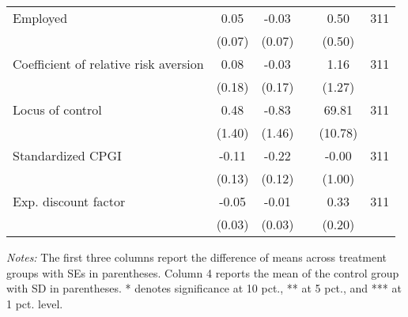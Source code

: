\begin{table}[h]
{\begin{threeparttable}
\begin{tabular}{l*{5}{c}}
Employed  &     0.05&    -0.03&         &     0.50&      311\\
          &   (0.07)&   (0.07)&         &   (0.50)&         \\
Coefficient of relative risk aversion&     0.08&    -0.03&         &     1.16&      311\\
          &   (0.18)&   (0.17)&         &   (1.27)&         \\
Locus of control&     0.48&    -0.83&         &    69.81&      311\\
          &   (1.40)&   (1.46)&         &  (10.78)&         \\
Standardized CPGI&    -0.11&-0.22\sym{*}&         &    -0.00&      311\\
          &   (0.13)&   (0.12)&         &   (1.00)&         \\
Exp. discount factor&-0.05\sym{*}&    -0.01&         &     0.33&      311\\
          &   (0.03)&   (0.03)&         &   (0.20)&         \\
\bottomrule \end{tabular} \begin{tablenotes}[flushleft] \footnotesize \item \emph{Notes:} The first three columns report the difference of means across treatment groups with SEs in parentheses. Column 4 reports the mean of the control group with SD in parentheses. * denotes significance at 10 pct., ** at 5 pct., and *** at 1 pct. level. \end{tablenotes} \end{threeparttable} } \end{table}

